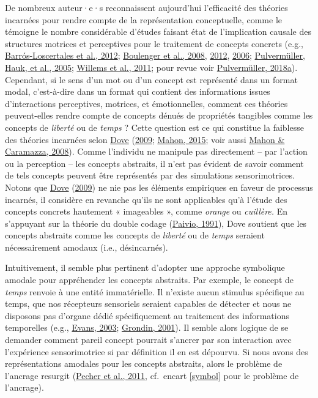 \documentclass[
  a4paper,12pt,twoside,onecolumn,openright,final,oldfontcommands]{memoir}
\begin{document}
De nombreux auteur·e·s reconnaissent aujourd'hui l'efficacité des théories incarnées pour rendre compte de la représentation conceptuelle, comme le témoigne le nombre considérable d'études faisant état de l'implication causale des structures motrices et perceptives pour le traitement de concepts concrets (e.g., \protect\hyperlink{ref-barros-loscertales_reading_2012}{Barrós-Loscertales et al., 2012}; \protect\hyperlink{ref-boulenger_subliminal_2008}{Boulenger et al., 2008}, \protect\hyperlink{ref-boulenger_when_2012}{2012}, \protect\hyperlink{ref-boulenger_cross-talk_2006}{2006}; \protect\hyperlink{ref-pulvermuller_functional_2005}{Pulvermüller, Hauk, et al., 2005}; \protect\hyperlink{ref-willems_functional_2011}{Willems et al., 2011}; pour revue voir \protect\hyperlink{ref-pulvermuller_neural_2018}{Pulvermüller, 2018a}). Cependant, si le sens d'un mot ou d'un concept est représenté dans un format modal, c'est-à-dire dans un format qui contient des informations issues d'interactions perceptives, motrices, et émotionnelles, comment ces théories peuvent-elles rendre compte de concepts dénués de propriétés tangibles comme les concepts de \emph{liberté} ou de \emph{temps} ? Cette question est ce qui constitue la faiblesse des théories incarnées selon \protect\hyperlink{ref-dove_beyond_2009}{Dove} (\protect\hyperlink{ref-dove_beyond_2009}{2009}; \protect\hyperlink{ref-mahon_what_2015}{Mahon, 2015}; voir aussi \protect\hyperlink{ref-mahon_critical_2008}{Mahon \& Caramazza, 2008}). Comme l'individu ne manipule pas directement -- par l'action ou la perception -- les concepts abstraits, il n'est pas évident de savoir comment de tels concepts peuvent être représentés par des simulations sensorimotrices. Notons que \protect\hyperlink{ref-dove_beyond_2009}{Dove} (\protect\hyperlink{ref-dove_beyond_2009}{2009}) ne nie pas les éléments empiriques en faveur de processus incarnés, il considère en revanche qu'ils ne sont applicables qu'à l'étude des concepts concrets hautement « imageables », comme \emph{orange} ou \emph{cuillère.} En s'appuyant sur la théorie du double codage (\protect\hyperlink{ref-paivio_dual_1991}{Paivio, 1991}), Dove soutient que les concepts abstraits comme les concepts de \emph{liberté} ou de \emph{temps} seraient nécessairement amodaux (i.e., désincarnés).

Intuitivement, il semble plus pertinent d'adopter une approche symbolique amodale pour appréhender les concepts abstraits. Par exemple, le concept de \emph{temps} renvoie à une entité immatérielle. Il n'existe aucun stimulus spécifique au temps, que nos récepteurs sensoriels seraient capables de détecter et nous ne disposons pas d'organe dédié spécifiquement au traitement des informations temporelles (e.g., \protect\hyperlink{ref-evans_structure_2003}{Evans, 2003}; \protect\hyperlink{ref-grondin_physical_2001}{Grondin, 2001}). Il semble alors logique de se demander comment pareil concept pourrait s'ancrer par son interaction avec l'expérience sensorimotrice si par définition il en est dépourvu. Si nous avons des représentations amodales pour les concepts abstraits, alors le problème de l'ancrage resurgit
(\protect\hyperlink{ref-pecher_abstract_2011}{Pecher et al., 2011}, cf.~encart \ref{symbol} pour le problème de l'ancrage).
\end{document}
